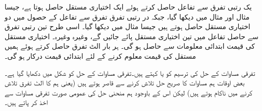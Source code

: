 یک رتبی تفرق سے تفاعل حاصل کرتے ہوئے ایک اختیاری مستقل حاصل ہوتا ہے، جیسا مثال  اور مثال  میں دیکھا گیا،  جبکہ در رتبی تفرق تفرق سے تفاعل کے حصول میں دو اختیاری مستقل حاصل ہوتے ہیں جیسا مثال  میں دیکھا گیا۔ اسی طرح تین رتبی تفرق سے  حاصل تفاعل میں تین اختیاری مستقل پائے جائیں گے، وغیرہ وغیرہ۔ اختیاری مستقل کی قیمت ابتدائی معلومات سے  حاصل ہو گی۔ ہر بار الٹ تفرق حاصل کرتے ہوئے ہمیں مستقل کی قیمت معلوم کرنے کے لئے ابتدائی قیمت درکار ہو گی۔

تفرقی مساوات کے حل کی ترسیم کو  یا  کہتے ہیں۔تفرقی مساوات  کے حل  کو شکل  میں دکھایا گیا ہے۔ بعض اوقات ہم مساوات  کا صریح حل تلاش کرنے سے قاصر ہوتے ہیں (یعنی ہم  کا الٹ تفرق تلاش کرنے میں ناکام ہوتے ہیں) لیکن اس کے باوجود ہم منحنی حل کی عمومی صورت تفرقی مساوات سے اخذ کر پاتے ہیں۔

